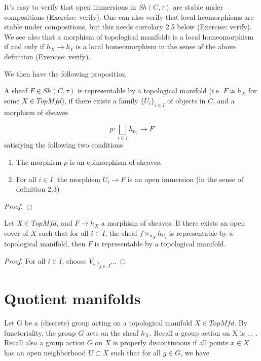 \documentclass[../main.tex]{subfiles}
\begin{document}
It's easy to verify that open immersions in $Sh(C, \tau)$ are stable under compositions (Exercise: verify). One can also verify that local heomorphisms are stable under compositions, but this needs corrolary 2.5 below (Exercise: verify). We see also that a morphism of topological manifolds is a local homeomorphism if and only if $h_X \to h_Y$ is a local homeomorphism in the sense of the above definition (Exercise: verify).

We then have the following proposition

\begin{prop}
    A sheaf $F \in Sh(C, \tau)$ is representable by a topological manifold (i.e. $F \simeq h_X$ for some $X \in TopMfd$), if there exists a family $\{U_i\}_{i \in I}$ of objects in $C$, and a morphism of sheaves

    \[
        p: \bigsqcup_{i \in I} h_{U_i} \to F
    \]
    satisfying the following two conditions

    \begin{enumerate}
        \item The morphism $p$ is an epimorphism of sheaves.
        \item For all $i \in I$, the morphism $U_i \to F$ is an open immersion (in the sense of definition 2.3)
    \end{enumerate}
\end{prop}

\begin{proof}
\end{proof}

\begin{cor}
    Let $X \in TopMfd$, and $F \to h_X$ a morphism of sheaves. If there exists an open cover of $X$ such that for all $i \in I$, the sheaf $f \times_{h_X} h_{U_i}$ is representable by a topological manifold, then $F$ is representable by a topological manifold.
\end{cor}
\begin{proof}
    For all $i \in I$, choose ${V_{i, j}}_{j \in J}$...
\end{proof}


\section{Quotient manifolds}

Let G be a (discrete) group acting on a topological manifold $X \in TopMfd$. By functoriality, the group $G$ acts on the sheaf $h_X$. Recall a group action on X is ... . Recall also a group action $G$ on $X$ is properly discontinuous if all points $x \in X$ has an open neighborhood $U \subset X$ such that for all $g \in G$, we have
\end{document}
